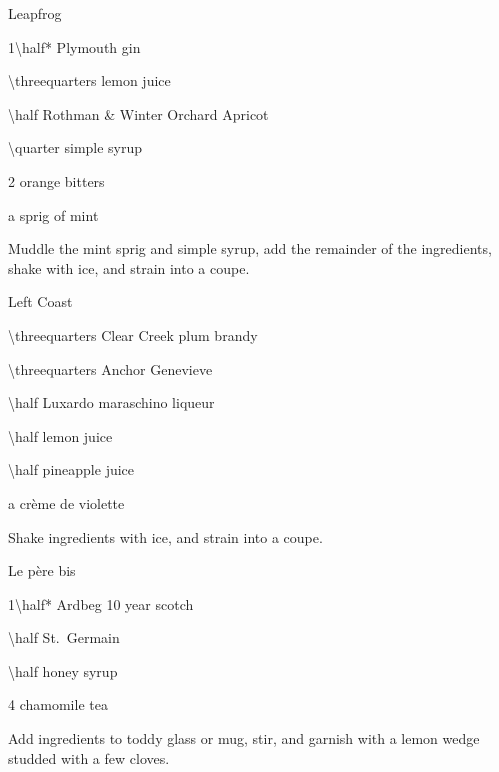 \begin{Cocktail}[\PDT]{Leapfrog}
  \begin{Ingredients}
  \item \SI{1\half*}{\oz} Plymouth gin
  \item \SI{\threequarters}{\oz} lemon juice
  \item \SI{\half}{\oz} Rothman \& Winter Orchard Apricot
  \item \SI{\quarter}{\oz} simple syrup
  \item 2 \si{\dashes} orange bitters
  \item a sprig of mint
  \end{Ingredients}
  
  \begin{Instructions}
	Muddle the mint sprig and simple syrup, add the remainder of the ingredients, shake with ice, and strain into a coupe.
  \end{Instructions}
\end{Cocktail}

\begin{Cocktail}[\PDT]{Left Coast}
  \begin{Ingredients}
  \item \SI{\threequarters}{\oz} Clear Creek plum brandy
  \item \SI{\threequarters}{\oz} Anchor Genevieve
  \item \SI{\half}{\oz} Luxardo maraschino liqueur
  \item \SI{\half}{\oz} lemon juice
  \item \SI{\half}{\oz} pineapple juice
  \item a \si{\dash} cr\`eme de violette
  \end{Ingredients}
  
  \begin{Instructions}
	Shake ingredients with ice, and strain into a coupe.
  \end{Instructions}
\end{Cocktail}

\begin{Cocktail}[\PDT]{Le p\`ere bis}
  \begin{Ingredients}
  \item \SI{1\half*}{\oz} Ardbeg 10 year scotch
  \item \SI{\half}{\oz} St.\ Germain
  \item \SI{\half}{\oz} honey syrup
  \item \SI{4}{\oz} chamomile tea
  \end{Ingredients}
  
  \begin{Instructions}
	Add ingredients to toddy glass or mug, stir, and garnish with a lemon wedge studded with a few cloves.
  \end{Instructions}
\end{Cocktail}

